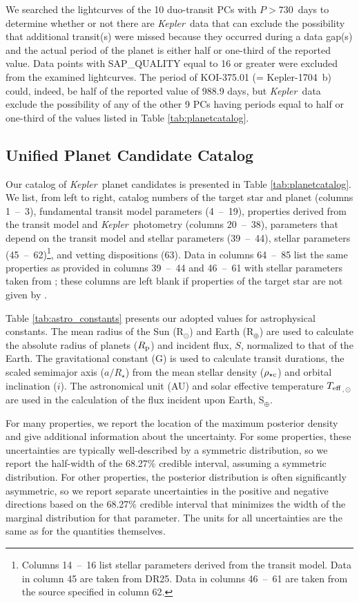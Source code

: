 \documentclass{aastex62}
\newcommand{\ik}{{\it Kepler~}}
\newcommand{\teff}{\ensuremath{T_{\rm eff}}}
\newcommand{\rhoc}{\ensuremath{\rho_{\star {\rm c}}}}
\newcommand{\rpl}{\ensuremath{R_{\rm p}}}
\newcommand{\adrs}{\ensuremath{a/R_\star}}
\begin{document}
We searched the lightcurves of the 10 duo-transit PCs with $P > 730$~days to determine whether or not there are \ik data that can exclude the possibility that additional transit(s) were missed because they occurred during a data gap(s) and the actual period of the planet is either half or one-third of the reported value. Data points with SAP\_QUALITY equal to 16 or greater were excluded from the examined lightcurves. The period of KOI-375.01 (= Kepler-1704~b) could, indeed, be half of the reported value of 988.9 days, but \ik data exclude the possibility of any of the other 9 PCs having periods equal to  half or one-third of the values listed in Table \ref{tab:planetcatalog}.

\subsection{Unified Planet Candidate Catalog} \label{sec:unified}

Our catalog of \ik planet candidates is presented in Table \ref{tab:planetcatalog}.  We list, from left to right, catalog numbers of the target star and planet (columns 1~--~3), fundamental transit model parameters (4~--~19), properties derived from the transit model and \ik photometry (columns 20~--~38), parameters that depend on the transit model and stellar parameters (39~--~44), stellar parameters (45~--~62)\footnote{Columns 14~--~16 list stellar parameters derived from the transit model. Data in column 45 are taken from DR25.  Data in columns 46~--~61 are taken from the source specified in column 62.}, and vetting dispositions (63).  Data in columns 64~--~85 list the same properties as provided in columns 39~--~44 and 46~--~61 with stellar parameters taken from \cite{Berger:2020a}; these columns are left blank if properties of the target star are not given by \cite{Berger:2020a}.

Table \ref{tab:astro_constants} presents our adopted values for astrophysical constants.  The mean radius of the Sun (R$_{\odot}$) and Earth (R$_{\oplus}$) are used to calculate the absolute radius of planets (\rpl) and incident flux, $S$, normalized to that of the Earth.  The gravitational constant (G) is used to calculate transit durations, the scaled semimajor axis (\adrs) from the mean stellar density (\rhoc) and orbital inclination ($i$).  The astronomical unit (AU) and solar effective temperature \teff$_{,\odot}$ are used in the calculation of the flux incident upon Earth, S$_\oplus$.  

For many properties, we report the location of the maximum posterior density and give additional information about the uncertainty.  For some properties, these uncertainties are typically well-described by a symmetric distribution, so we report the half-width of the 68.27\% credible interval, assuming a symmetric distribution. For other properties, the posterior distribution is often significantly asymmetric, so we report separate uncertainties in the positive and negative directions based on the 68.27\% credible interval that minimizes the width of the marginal distribution for that parameter. The units for all uncertainties are the same as for the quantities themselves.  
\end{document}
